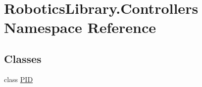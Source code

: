 \hypertarget{namespace_robotics_library_1_1_controllers}{}\section{Robotics\+Library.\+Controllers Namespace Reference}
\label{namespace_robotics_library_1_1_controllers}
\subsection*{Classes}
\begin{DoxyCompactItemize}
\item 
class \hyperlink{class_robotics_library_1_1_controllers_1_1_p_i_d}{P\+ID}
\end{DoxyCompactItemize}
